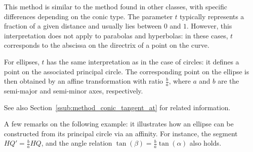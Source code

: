 This method is similar to the  method found in other classes, with specific differences depending on the conic type.
The parameter \( t \) typically represents a fraction of a given distance and usually lies between \( 0 \) and \( 1 \). However, this interpretation does not apply to parabolas and hyperbolas: in these cases, \( t \) corresponds to the abscissa on the directrix of a point on the curve.

For ellipses, \( t \) has the same interpretation as in the case of circles: it defines a point on the associated principal circle.
The corresponding point on the ellipse is then obtained by an affine transformation with ratio \( \frac{b}{a} \), where \( a \) and \( b \) are the semi-major and semi-minor axes, respectively.

See also Section~\ref{ssub:method_conic_tangent_at} for related information.

A few remarks on the following example: it illustrates how an ellipse can be constructed from its principal circle via an affinity.
For instance, the segment \( HQ' = \frac{b}{a} HQ \), and the angle relation \( \tan(\beta) = \frac{b}{a} \tan(\alpha) \) also holds.

\vspace{1em}

